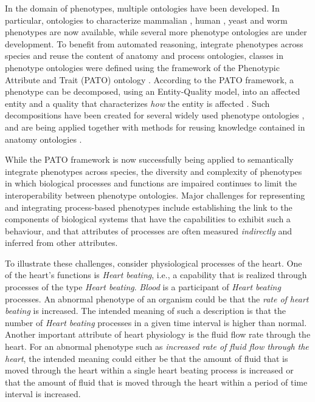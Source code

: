 \documentclass[11pt]{article}
\renewcommand{\cite}{\citep}
\begin{document}
In the domain of phenotypes, multiple ontologies have been
developed. In particular, ontologies to characterize mammalian
\cite{Smith2004}, human \cite{Robinson2008}, yeast \cite{ypo} and worm
\cite{wpo} phenotypes are now available, while several more phenotype
ontologies are under development. To benefit from automated reasoning,
integrate phenotypes across species and reuse the content of anatomy
and process ontologies, classes in phenotype ontologies were defined
using the framework of the Phenotypic Attribute and Trait (PATO)
ontology \cite{Gkoutos2005}. According to the PATO framework, a
phenotype can be decomposed, using an Entity-Quality model, into an
affected entity and a quality that characterizes {\em how} the entity
is affected \cite{Gkoutos2005}. Such decompositions have been created
for several widely used phenotype ontologies \cite{Mungall2010,
  Gkoutos2009b, obml2011h1}, and are being applied together with
methods for reusing knowledge contained in anatomy ontologies
\cite{Mungall2010, Hoehndorf2010phene}.

While the PATO framework is now successfully being applied to
semantically integrate phenotypes across species, the diversity and
complexity of phenotypes in which biological processes and functions
are impaired continues to limit the interoperability between phenotype
ontologies. Major challenges for representing and integrating
process-based phenotypes include establishing the link to the
components of biological systems that have the capabilities to exhibit
such a behaviour, and that attributes of processes are often measured
{\em indirectly} and inferred from other attributes.

To illustrate these challenges, consider physiological processes of
the heart. One of the heart's functions is {\em Heart beating}, i.e.,
a capability that is realized through processes of the type {\em Heart
  beating}. {\em Blood} is a participant of {\em Heart beating}
processes.  An abnormal phenotype of an organism could be that the
{\em rate of heart beating} is increased. The intended meaning of such
a description is that the number of {\em Heart beating} processes in a
given time interval is higher than normal. Another important attribute
of heart physiology is the fluid flow rate through the heart. For an
abnormal phenotype such as {\em increased rate of fluid flow through
  the heart}, the intended meaning could either be that the amount of
fluid that is moved through the heart within a single heart beating
process is increased or that the amount of fluid that is moved through
the heart within a period of time interval is increased. 
\end{document}
